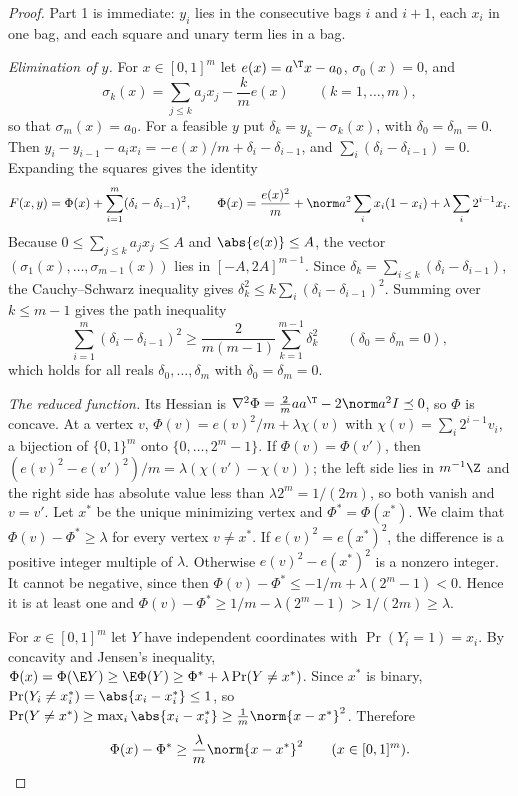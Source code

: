 \begin{proof}
Part 1 is immediate: $y_i$ lies in the consecutive bags $i$ and $i+1$, each
$x_i$ in one bag, and each square and unary term lies in a bag.

\emph{Elimination of $y$.} For $x\in[0,1]^m$ let
$e(x)=a^{\T}x-a_0$, $\sigma_0(x)=0$, and
\[
\sigma_k(x)=\sum_{j\le k}a_jx_j-\frac kme(x)\qquad(k=1,\ldots,m),
\]
so that $\sigma_m(x)=a_0$. For a feasible $y$ put $\delta_k=y_k-\sigma_k(x)$,
with $\delta_0=\delta_m=0$. Then
$y_i-y_{i-1}-a_ix_i=-e(x)/m+\delta_i-\delta_{i-1}$, and
$\sum_i(\delta_i-\delta_{i-1})=0$. Expanding the squares gives the identity
\begin{equation}\label{lim:eq:split}
F(x,y)=\Phi(x)+\sum_{i=1}^m(\delta_i-\delta_{i-1})^2,\qquad
\Phi(x)=\frac{e(x)^2}m+\norm a^2\sum_ix_i(1-x_i)+\lambda\sum_i2^{i-1}x_i .
\end{equation}
Because $0\le\sum_{j\le k}a_jx_j\le A$ and $\abs{e(x)}\le A$, the vector
$(\sigma_1(x),\ldots,\sigma_{m-1}(x))$ lies in $[-A,2A]^{m-1}$.
Since $\delta_k=\sum_{i\le k}(\delta_i-\delta_{i-1})$, the Cauchy--Schwarz
inequality gives $\delta_k^2\le k\sum_i(\delta_i-\delta_{i-1})^2$. Summing
over $k\le m-1$ gives the path inequality
\begin{equation}\label{lim:eq:path}
\sum_{i=1}^m(\delta_i-\delta_{i-1})^2\ge\frac2{m(m-1)}\sum_{k=1}^{m-1}
\delta_k^2\qquad(\delta_0=\delta_m=0),
\end{equation}
which holds for all reals $\delta_0,\ldots,\delta_m$ with $\delta_0=\delta_m=0$.

\emph{The reduced function.} Its Hessian is
$\nabla^2\Phi=\tfrac2maa^{\T}-2\norm a^2I\preceq0$, so $\Phi$ is concave. At a
vertex $v$, $\Phi(v)=e(v)^2/m+\lambda\chi(v)$ with
$\chi(v)=\sum_i2^{i-1}v_i$, a bijection of $\{0,1\}^m$ onto
$\{0,\ldots,2^m-1\}$. If $\Phi(v)=\Phi(v')$, then
$(e(v)^2-e(v')^2)/m=\lambda(\chi(v')-\chi(v))$; the left side lies in
$m^{-1}\Z$ and the right side has absolute value less than
$\lambda2^m=1/(2m)$, so both vanish and $v=v'$. Let $x^*$ be the unique
minimizing vertex and $\Phi^*=\Phi(x^*)$. We claim that
$\Phi(v)-\Phi^*\ge\lambda$ for every vertex $v\ne x^*$. If
$e(v)^2=e(x^*)^2$, the difference is a positive integer multiple of
$\lambda$. Otherwise $e(v)^2-e(x^*)^2$ is a nonzero integer. It cannot be
negative, since then $\Phi(v)-\Phi^*\le-1/m+\lambda(2^m-1)<0$. Hence it
is at least one and $\Phi(v)-\Phi^*\ge1/m-\lambda(2^m-1)>1/(2m)\ge\lambda$.

For $x\in[0,1]^m$ let $Y$ have independent coordinates with
$\Pr(Y_i=1)=x_i$. By concavity and Jensen's inequality,
$\Phi(x)=\Phi(\E Y)\ge\E\Phi(Y)\ge\Phi^*+\lambda\Pr(Y\ne x^*)$. Since $x^*$ is
binary, $\Pr(Y_i\ne x_i^*)=\abs{x_i-x_i^*}\le1$, so
$\Pr(Y\ne x^*)\ge\max_i\abs{x_i-x_i^*}\ge\frac1m\norm{x-x^*}^2$. Therefore
\begin{equation}\label{lim:eq:phigrowth}
\Phi(x)-\Phi^*\ge\frac\lambda m\norm{x-x^*}^2\qquad(x\in[0,1]^m).
\end{equation}


\end{proof}
